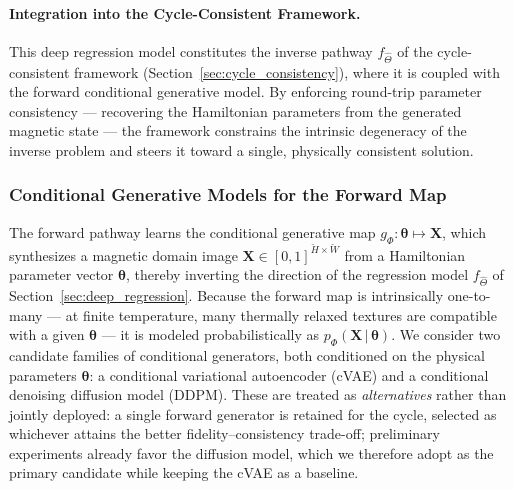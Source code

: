 \documentclass[letterpaper, 12, one column]{article}
\begin{document}
\paragraph{Integration into the Cycle-Consistent Framework.}
This deep regression model constitutes the inverse pathway $f_{\hat{\Theta}}$ of the cycle-consistent framework (Section~\ref{sec:cycle_consistency}), where it is coupled with the forward conditional generative model. By enforcing round-trip parameter consistency --- recovering the Hamiltonian parameters from the generated magnetic state --- the framework constrains the intrinsic degeneracy of the inverse problem and steers it toward a single, physically consistent solution.

\subsubsection{Conditional Generative Models for the Forward Map}\label{sec:cvae_forward}

The forward pathway learns the conditional generative map $g_{\Phi}:\boldsymbol{\theta}\mapsto\mathbf{X}$, which synthesizes a magnetic domain image $\mathbf{X}\in[0,1]^{\breve{H}\times\breve{W}}$ from a Hamiltonian parameter vector $\boldsymbol{\theta}$, thereby inverting the direction of the regression model $f_{\hat{\Theta}}$ of Section~\ref{sec:deep_regression}. Because the forward map is intrinsically one-to-many --- at finite temperature, many thermally relaxed textures are compatible with a given $\boldsymbol{\theta}$ --- it is modeled probabilistically as $p_{\Phi}(\mathbf{X}\,|\,\boldsymbol{\theta})$. We consider two candidate families of conditional generators, both conditioned on the physical parameters $\boldsymbol{\theta}$: a conditional variational autoencoder (cVAE) and a conditional denoising diffusion model (DDPM). These are treated as \emph{alternatives} rather than jointly deployed: a single forward generator is retained for the cycle, selected as whichever attains the better fidelity--consistency trade-off; preliminary experiments already favor the diffusion model, which we therefore adopt as the primary candidate while keeping the cVAE as a baseline.
\end{document}
